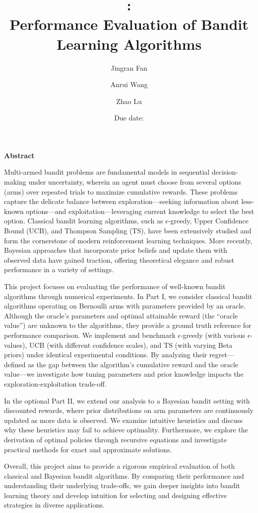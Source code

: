 \documentclass[11pt]{article}
\title{
    \vspace{100pt}
    \bigskip
    \textbf{\CourseName:} \\
    \textbf{Performance Evaluation of Bandit Learning Algorithms} \\
    \bigskip
}
\author{Jingran Fan \and Anrui Wang \and Zhao Lu}
\date{Due date: \DueDate}
\renewenvironment{abstract}
  {\begin{center}\bfseries\Large Abstract\vspace{1em}\end{center}%
   \normalsize} %
  {}
\begin{document}
\setlength{\parindent}{2em}

\maketitle

\newpage

\begin{abstract}

Multi-armed bandit problems are fundamental models in sequential decision-making under uncertainty, wherein an agent must choose from several options (arms) over repeated trials to maximize cumulative rewards. These problems capture the delicate balance between exploration—seeking information about less-known options—and exploitation—leveraging current knowledge to select the best option. Classical bandit learning algorithms, such as 
$\epsilon$-greedy, Upper Confidence Bound (UCB), and Thompson Sampling (TS), have been extensively studied and form the cornerstone of modern reinforcement learning techniques. More recently, Bayesian approaches that incorporate prior beliefs and update them with observed data have gained traction, offering theoretical elegance and robust performance in a variety of settings.

This project focuses on evaluating the performance of well-known bandit algorithms through numerical experiments. In Part I, we consider classical bandit algorithms operating on Bernoulli arms with parameters provided by an oracle. Although the oracle’s parameters and optimal attainable reward (the “oracle value”) are unknown to the algorithms, they provide a ground truth reference for performance comparison. We implement and benchmark 
$\epsilon$-greedy (with various $\epsilon$-values), UCB (with different confidence scales), and TS (with varying Beta priors) under identical experimental conditions. By analyzing their regret—defined as the gap between the algorithm’s cumulative reward and the oracle value—we investigate how tuning parameters and prior knowledge impacts the exploration-exploitation trade-off.

In the optional Part II, we extend our analysis to a Bayesian bandit setting with discounted rewards, where prior distributions on arm parameters are continuously updated as more data is observed. We examine intuitive heuristics and discuss why these heuristics may fail to achieve optimality. Furthermore, we explore the derivation of optimal policies through recursive equations and investigate practical methods for exact and approximate solutions.

Overall, this project aims to provide a rigorous empirical evaluation of both classical and Bayesian bandit algorithms. By comparing their performance and understanding their underlying trade-offs, we gain deeper insights into bandit learning theory and develop intuition for selecting and designing effective strategies in diverse applications.
\end{abstract}
\end{document}

